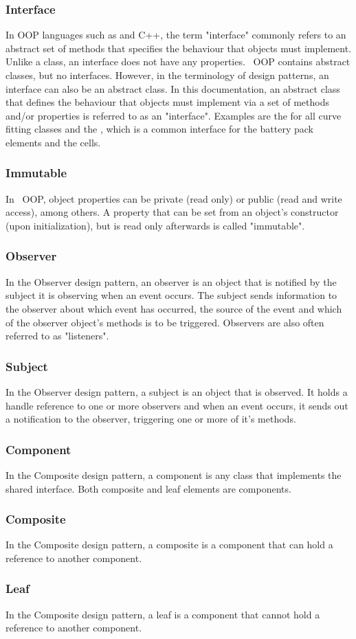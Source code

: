 \subsubsection*{Interface} \label{sec:interface}
In OOP languages such as \java and C++, the term "interface" commonly refers to an abstract set of methods that specifies the behaviour that objects must implement. Unlike a class, an interface does not have any properties. \matlab\ OOP contains abstract classes, but no interfaces. However, in the terminology of design patterns, an interface can also be an abstract class. In this documentation, an abstract class that defines the behaviour that objects must implement via a set of methods and/or properties is referred to as an "interface". Examples are the  for all curve fitting classes and the , which is a common interface for the battery pack elements and the cells.

\subsubsection*{Immutable}
In \matlab\ OOP, object properties can be private (read only) or public (read and write access), among others. A property that can be set from an object's constructor (upon initialization), but is read only afterwards is called "immutable".

\subsubsection*{Observer}
In the Observer design pattern, an observer is an object that is notified by the subject it is observing when an event occurs. The subject sends information to the observer about which event has occurred, the source of the event and which of the observer object's methods is to be triggered. Observers are also often referred to as "listeners".

\subsubsection*{Subject}
In the Observer design pattern, a subject is an object that is observed. It holds a handle reference to one or more observers and when an event occurs, it sends out a notification to the observer, triggering one or more of it's methods.

\subsubsection*{Component}
In the Composite design pattern, a component is any class that implements the shared interface. Both composite and leaf elements are components.

\subsubsection*{Composite}
In the Composite design pattern, a composite is a component that can hold a reference to another component.

\subsubsection*{Leaf}
In the Composite design pattern, a leaf is a component that cannot hold a reference to another component.